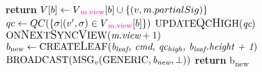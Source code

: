 \begin{algorithm}[h!]
\begin{algorithmic}[1]
	\EndProcedure
		\color{Green}
			\color{black}
				\State \textbf{return}
			\EndIf
			\State $V[b] \gets V\textcolor{Magenta}{\textsubscript{m.view}}[b] \cup \{(v, m.partialSig)\}$
				\State $qc \gets QC(\{ \sigma | (v', \sigma) \in V\textcolor{Magenta}{\textsubscript{m.view}}[b]\})$
				\State $ \text{UPDATE{\large Q}C{\large H}IGH}(\textit{qc}) $
				\color{Green}
				\State $\text{ON{\large N}EXT{\large S}YNC{\large V}IEW}(\textit{m.view} + 1)$
				\color{black}
			\EndIf
		\EndIf
	\EndProcedure
		\State $b\textsubscript{new} \gets \text{CREATE{\large L}EAF}(\textit{b\textsubscript{leaf}, \textit{cmd}, \textit{qc\textsubscript{high}}, \textit{b\textsubscript{leaf}.height} + 1})$
		\State $ \text{BROADCAST}(\text{MSG}\textsubscript{\textit{v}}(\text{GENERIC}, \textit{b\textsubscript{new}}, \bot)) $
		\State \textbf{return} b\textsubscript{new}
	\EndFunction
	\end{algorithmic}
\end{algorithm}

